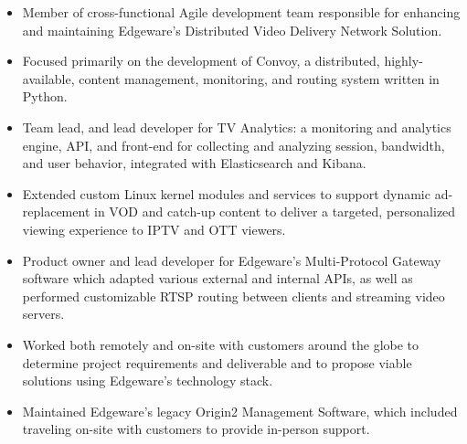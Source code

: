 \documentclass[11pt,letterpaper,roman]{moderncv} %
\begin{document}
{
\begin{itemize}
\item Member of cross-functional Agile development team responsible for enhancing and maintaining Edgeware's Distributed Video Delivery Network Solution.
\item Focused primarily on the development of Convoy, a distributed, highly-available, content management, monitoring, and routing system written in Python. 
\item Team lead, and lead developer for TV Analytics: a monitoring and analytics engine, API, and front-end for collecting and analyzing session, bandwidth, and user behavior, integrated with Elasticsearch and Kibana.
\item Extended custom Linux kernel modules and services to support dynamic ad-replacement in VOD and catch-up content to deliver a targeted, personalized viewing experience to IPTV and OTT viewers.
\item Product owner and lead developer for Edgeware's Multi-Protocol Gateway software which adapted various external and internal APIs, as well as performed customizable RTSP routing between clients and streaming video servers.
\item Worked both remotely and on-site with customers around the globe to determine project requirements and deliverable and to propose viable solutions using Edgeware's technology stack.
\item Maintained Edgeware's legacy Origin2 Management Software, which included traveling on-site with customers to provide in-person support.
\end{itemize}
}
\end{document}
